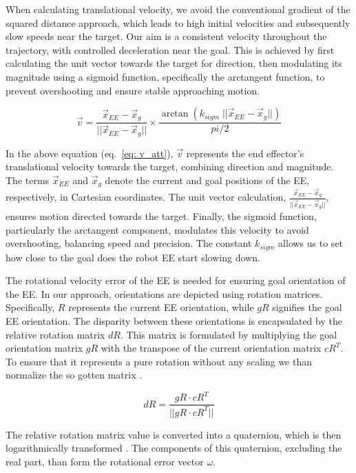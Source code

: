 \documentclass[]{article}
\begin{document}
When calculating translational velocity, we avoid the conventional gradient of the squared distance approach, which leads to high initial velocities and subsequently slow speeds near the target. Our aim is a consistent velocity throughout the trajectory, with controlled deceleration near the goal. This is achieved by first calculating the unit vector towards the target for direction, then modulating its magnitude using a sigmoid function, specifically the arctangent function, to prevent overshooting and ensure stable approaching motion.

\begin{equation} 
	\vec{v} = \frac{\vec{x}_{EE} - \vec{x}_g}{||\vec{x}_{EE} - \vec{x}_g||} \times \frac{\arctan(k_{sigm} \; ||\vec{x}_{EE} - \vec{x}_g||) }{pi/2}
	\label{eq: v_att}
\end{equation}

In the above equation (eq.~\ref{eq: v_att}), $\vec{v}$  represents the end effector's translational velocity towards the target, combining direction and magnitude. The terms $\vec{x}_{EE}$ and $\vec{x}_g$ denote the current and goal positions of the EE, respectively, in Cartesian coordinates. The unit vector calculation, $\frac{\vec{x}_{EE}-\vec{x}_g}{||\vec{x}_{EE}-\vec{x}_g||}$, ensures motion directed towards the target. Finally, the sigmoid function, particularly the arctangent component, modulates this velocity to avoid overshooting, balancing speed and precision. The constant $k_{sigm}$ allows us to set how close to the goal does the robot EE start slowing down.

The rotational velocity error of the EE is needed for ensuring goal orientation of the EE. In our approach, orientations are depicted using rotation matrices. Specifically, \( R \) represents the current EE orientation, while \( gR \) signifies the goal EE orientation. The disparity between these orientations is encapsulated by the relative rotation matrix \( dR \). This matrix is formulated by multiplying the goal orientation matrix \( gR \) with the transpose of the current orientation matrix \( cR^{T} \). To ensure that it represents a pure rotation without any scaling we than normalize the so gotten matrix .

\begin{equation}
	dR = \frac{gR \cdot cR^{T}}{||gR \cdot cR^{T}||}
	\label{eq: rot_diff_mat}
\end{equation}

The relative rotation matrix value is converted into a quaternion, which is then logarithmically transformed . The components of this quaternion, excluding the real part, than form the rotational error vector \( \omega \).
\end{document}
